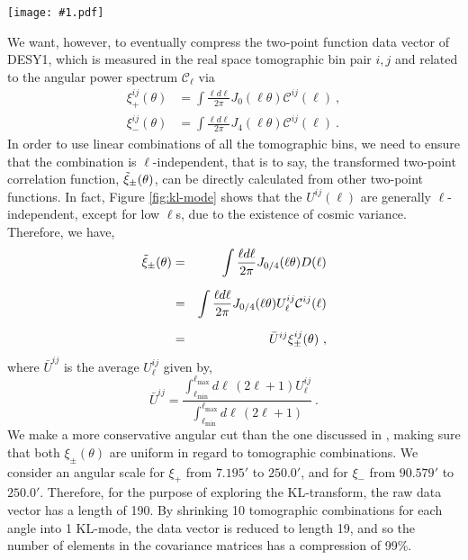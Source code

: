 \documentclass[aps, prd, twocolumn, superscriptaddress, nofootinbib, amssymb, amsmath]{revtex4-2}
\newcommand{\sfig}[3]{
	\texttt{[image: \#1.pdf]}
	\caption{#3}
	\label{fig:#1}
}
\newcommand{\rf}[1]{Figure \ref{fig:#1}}
\newcommand\be{\begin{equation}}
\newcommand\ee{\end{equation}}
\newcommand\bea{\begin{eqnarray}}
\newcommand\eea{\end{eqnarray}}
\newcommand\ctot{\mathcal{C}}
\begin{document}
\begin{figure*}[thbp]
	\sfig{kl-mode}{0.8\textwidth}
	{\textbf{Left:} Column vectors of the matrix $R_{\ell}$, or $e^p_{\ell} N^{-\frac{1}{2}}$, for compressing the shear power spectrum $\ctot_{\ell}$.
		\textbf{Right:} Transformation on tomographic bin combination $U_{ij}$ constructed from the KL-eigenmodes. For both plots, the dashed black lines are the weighted average of each mode. The lightest shade represents $\ell = 10$ and the increment is $\Delta \ell = 10$ for each darker shade.}
\end{figure*}

We want, however, to eventually compress the two-point function data vector of DESY1, which is measured in the real space tomographic bin pair ${i, j}$ and related to the angular power spectrum $\ctot_{\ell}$ via
\be\begin{split}
	\xi_{+}^{ij}(\theta) &= \int \frac{\ell d \ell }{2\pi}J_{0}(\ell \theta) \ctot^{ij}(\ell)\ , \\[2ex]
	\xi_{-}^{ij}(\theta) &= \int \frac{\ell d \ell }{2\pi}J_{4}(\ell \theta) \ctot^{ij}(\ell)\ 
	.\end{split}\ee
In order to use linear combinations of all the tomographic bins, we need to ensure that the combination is $\ell$-independent, that is to say, the transformed two-point correlation function, $\Tilde{\xi}_{\pm}(\theta)$, can be directly calculated from other two-point functions. In fact, \rf{kl-mode} shows that the $U^{ij}(\ell)$ are generally $\ell$-independent, except for low $\ell$s, due to the existence of cosmic variance. Therefore, we have,
\bea
\nonumber \Tilde{\xi}_{\pm}(\theta) &=& \int \frac{\ell d \ell }{2\pi}J_{0/4}(\ell \theta) D(\ell)\\[1.5ex]
\nonumber &=&\int \frac{\ell d \ell }{2\pi}J_{0/4}(\ell \theta) U^{ij}_\ell \ctot^{ij}(\ell)\\[1.5ex]
&=&\bar{U}^{ij}\xi_{\pm}^{ij}(\theta)\
,\eea
where $\bar{U}^{ij}$ is the average $U^{ij}_{\ell}$ given by,
\be
\bar{U}^{ij} = \frac{\int_{\ell _{\text{min}}}^{\ell _{\text{max}}} d\ell\, (2 \ell +1) U^{ij}_{\ell}}{\int_{\ell _{\text{min}}}^{\ell _{\text{max}}} d\ell\, (2 \ell +1)}\
.\ee
We make a more conservative angular cut than the one discussed in \cite{Troxel:2017xyo}, making sure that both $\xi_{\pm}(\theta)$ are uniform in regard to tomographic combinations. We consider an angular scale for  $\xi_+$ from $7.195'$ to $250.0'$, and for $\xi_-$ from $90.579'$ to $250.0'$. Therefore, for the purpose of exploring the KL-transform, the raw data vector has a length of 190. By shrinking 10 tomographic combinations for each angle into 1 KL-mode, the data vector is reduced to length 19, and so the number of elements in the covariance matrices has a compression of 99\%.
\end{document}
